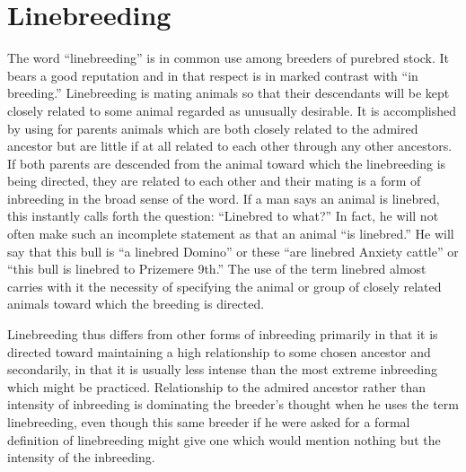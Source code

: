 \chapter{Linebreeding}
\label{cha:Lush_Chapter_23}

The word ``linebreeding'' is in common use among breeders of purebred
stock. It bears a good reputation and in that respect is in marked
contrast with ``in breeding.'' Linebreeding is mating animals so that
their descendants will be kept closely related to some animal regarded
as unusually desirable. It is accomplished by using for parents animals
which are both closely related to the admired ancestor but are little if at
all related to each other through any other ancestors. If both parents
are descended from the animal toward which the linebreeding is being
directed, they are related to each other and their mating is a form of
inbreeding in the broad sense of the word. If a man says an animal is
linebred, this instantly calls forth the question: ``Linebred to what?''
In fact, he will not often make such an incomplete statement as that an
animal ``is linebred.'' He will say that this bull is ``a linebred Domino''
or these ``are linebred Anxiety cattle'' or ``this bull is linebred to Prizemere
9th.'' The use of the term linebred almost carries with it the necessity
of specifying the animal or group of closely related animals toward
which the breeding is directed.

Linebreeding thus differs from other forms of inbreeding primarily
in that it is directed toward maintaining a high relationship to some
chosen ancestor and secondarily, in that it is usually less intense than
the most extreme inbreeding which might be practiced. Relationship
to the admired ancestor rather than intensity of inbreeding is dominating
the breeder's thought when he uses the term linebreeding, even
though this same breeder if he were asked for a formal definition of
linebreeding might give one which would mention nothing but the
intensity of the inbreeding.

